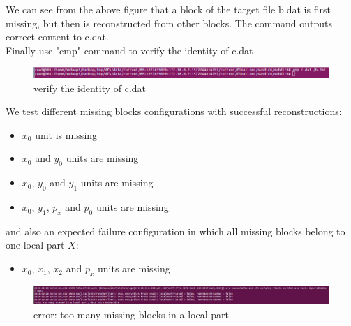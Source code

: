 \documentclass[10pt]{article}
\begin{document}
We can see from the above figure that a block of the target file b.dat is first missing, but then is  
reconstructed from other blocks. The command outputs correct content to c.dat. \\

Finally use "cmp" command to verify the identity of c.dat
\begin{figure}[H]
  \centering
  \includegraphics[width=\linewidth]{test-8.png}
  \caption{verify the identity of c.dat}
\end{figure}

We test different missing blocks configurations with successful reconstructions:
\begin{itemize}
\item $x_0$ unit is missing
\item $x_0$ and $y_0$ units are missing
\item $x_0$, $y_0$ and $y_1$ units are missing
\item $x_0$, $y_1$, $p_x$ and $p_0$ units are missing
\end{itemize}
and also an expected failure configuration in which all missing blocks belong to
one local part $X$:
\begin{itemize}
  \item $x_0$, $x_1$, $x_2$ and $p_x$ units are missing
\end{itemize}
\begin{figure}[H]
  \centering
  \includegraphics[width=\linewidth]{test-9.png}
  \caption{error: too many missing blocks in a local part}
\end{figure}









\end{document}
